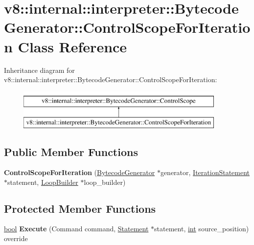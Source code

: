 \hypertarget{classv8_1_1internal_1_1interpreter_1_1BytecodeGenerator_1_1ControlScopeForIteration}{}\section{v8\+:\+:internal\+:\+:interpreter\+:\+:Bytecode\+Generator\+:\+:Control\+Scope\+For\+Iteration Class Reference}
\label{classv8_1_1internal_1_1interpreter_1_1BytecodeGenerator_1_1ControlScopeForIteration}
Inheritance diagram for v8\+:\+:internal\+:\+:interpreter\+:\+:Bytecode\+Generator\+:\+:Control\+Scope\+For\+Iteration\+:\begin{figure}[H]
\begin{center}
\leavevmode
\includegraphics[height=2.000000cm]{classv8_1_1internal_1_1interpreter_1_1BytecodeGenerator_1_1ControlScopeForIteration}
\end{center}
\end{figure}
\subsection*{Public Member Functions}
\begin{DoxyCompactItemize}
\item 
\mbox{\label{classv8_1_1internal_1_1interpreter_1_1BytecodeGenerator_1_1ControlScopeForIteration_a56cc5df612ee3df6d1f7e35852f10b46}} 
{\bfseries Control\+Scope\+For\+Iteration} (\mbox{\hyperlink{classv8_1_1internal_1_1interpreter_1_1BytecodeGenerator}{Bytecode\+Generator}} $\ast$generator, \mbox{\hyperlink{classv8_1_1internal_1_1IterationStatement}{Iteration\+Statement}} $\ast$statement, \mbox{\hyperlink{classv8_1_1internal_1_1interpreter_1_1LoopBuilder}{Loop\+Builder}} $\ast$loop\+\_\+builder)
\end{DoxyCompactItemize}
\subsection*{Protected Member Functions}
\begin{DoxyCompactItemize}
\item 
\mbox{\label{classv8_1_1internal_1_1interpreter_1_1BytecodeGenerator_1_1ControlScopeForIteration_a9db51b11905329aa69989ab39b2aff68}} 
\mbox{\hyperlink{classbool}{bool}} {\bfseries Execute} (Command command, \mbox{\hyperlink{classv8_1_1internal_1_1Statement}{Statement}} $\ast$statement, \mbox{\hyperlink{classint}{int}} source\+\_\+position) override
\end{DoxyCompactItemize}
